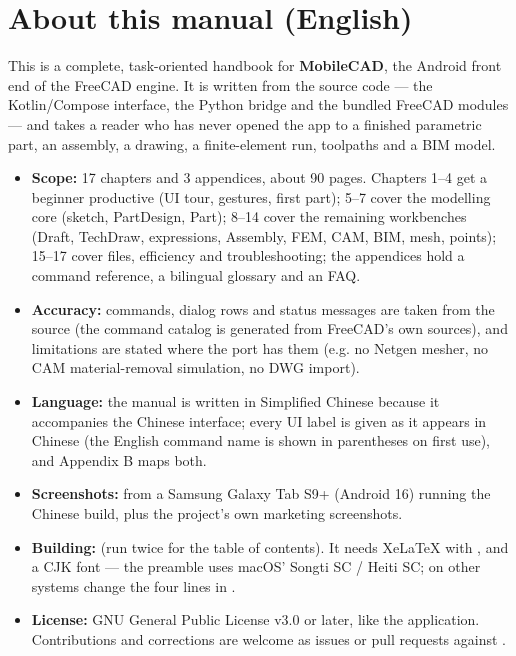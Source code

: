 \chapter*{About this manual (English)}

This is a complete, task-oriented handbook for \textbf{MobileCAD}, the Android front end of the FreeCAD engine.
It is written from the source code — the Kotlin/Compose interface, the Python bridge and the bundled FreeCAD
modules — and takes a reader who has never opened the app to a finished parametric part, an assembly, a
drawing, a finite-element run, toolpaths and a BIM model.

\begin{itemize}
  \item \textbf{Scope:} 17 chapters and 3 appendices, about 90 pages. Chapters 1--4 get a beginner productive
        (UI tour, gestures, first part); 5--7 cover the modelling core (sketch, PartDesign, Part); 8--14 cover
        the remaining workbenches (Draft, TechDraw, expressions, Assembly, FEM, CAM, BIM, mesh, points);
        15--17 cover files, efficiency and troubleshooting; the appendices hold a command reference, a bilingual
        glossary and an FAQ.
  \item \textbf{Accuracy:} commands, dialog rows and status messages are taken from the source (the command
        catalog is generated from FreeCAD's own sources), and limitations are stated where the port has them
        (e.g. no Netgen mesher, no CAM material-removal simulation, no DWG import).
  \item \textbf{Language:} the manual is written in Simplified Chinese because it accompanies the Chinese
        interface; every UI label is given as it appears in Chinese (the English command name is shown in
        parentheses on first use), and Appendix B maps both.
  \item \textbf{Screenshots:} from a Samsung Galaxy Tab S9+ (Android 16) running the Chinese build, plus the
        project's own marketing screenshots.
  \item \textbf{Building:}  (run twice for the table of contents). It needs
        XeLaTeX with , and a CJK font — the preamble uses macOS' Songti SC / Heiti SC; on other
        systems change the four  lines in .
  \item \textbf{License:} GNU General Public License v3.0 or later, like the application. Contributions and
        corrections are welcome as issues or pull requests against .
\end{itemize}
